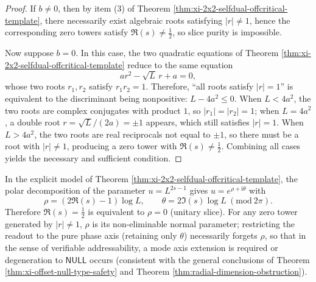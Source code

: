 \begin{proof}
If \(b\neq 0\), then by item (3) of Theorem \ref{thm:xi-2x2-selfdual-offcritical-template}, there necessarily exist algebraic roots satisfying \(|r|\neq 1\), hence the corresponding zero towers satisfy \(\Re(s)\neq\tfrac12\), so slice purity is impossible.
\par
Now suppose \(b=0\).
In this case, the two quadratic equations of Theorem \ref{thm:xi-2x2-selfdual-offcritical-template} reduce to the same equation
\[
a r^2-\sqrt L\,r+a=0,
\]
whose two roots \(r_1,r_2\) satisfy \(r_1r_2=1\).
Therefore, ``all roots satisfy \(|r|=1\)'' is equivalent to the discriminant being nonpositive:
\(
L-4a^2\le 0
\).
When \(L<4a^2\), the two roots are complex conjugates with product \(1\), so \(|r_1|=|r_2|=1\); when \(L=4a^2\), a double root \(r=\sqrt L/(2a)=\pm 1\) appears, which still satisfies \(|r|=1\).
When \(L>4a^2\), the two roots are real reciprocals not equal to \(\pm 1\), so there must be a root with \(|r|\neq 1\), producing a zero tower with \(\Re(s)\neq\tfrac12\).
Combining all cases yields the necessary and sufficient condition. \qedhere
\end{proof}

\begin{corollary}\label{cor:xi-2x2-selfdual-orthogonal-axis-projection-forget}
In the explicit model of Theorem \ref{thm:xi-2x2-selfdual-offcritical-template}, the polar decomposition of the parameter
\(
u=L^{2s-1}
\)
gives \(u=e^{\rho+\mathrm{i}\theta}\) with
\[
\rho=(2\Re(s)-1)\log L,\qquad \theta=2\Im(s)\log L\ (\mathrm{mod}\ 2\pi).
\]
Therefore \(\Re(s)=\tfrac12\) is equivalent to \(\rho=0\) (unitary slice).
For any zero tower generated by \(|r|\neq 1\), \(\rho\) is its non-eliminable normal parameter; restricting the readout to the pure phase axis (retaining only \(\theta\)) necessarily forgets \(\rho\), so that in the sense of verifiable addressability, a mode axis extension is required or degeneration to \(\mathsf{NULL}\) occurs (consistent with the general conclusions of Theorem \ref{thm:xi-offset-null-type-safety} and Theorem \ref{thm:radial-dimension-obstruction}).
\end{corollary}
